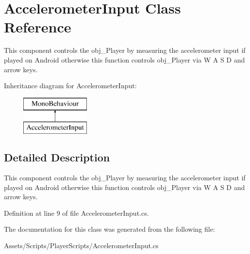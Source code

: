 \hypertarget{class_accelerometer_input}{\section{Accelerometer\+Input Class Reference}
\label{class_accelerometer_input}
}


This component controls the obj\+\_\+\+Player by measuring the accelerometer input if played on Android otherwise this function controls obj\+\_\+\+Player via W A S D and arrow keys.  


Inheritance diagram for Accelerometer\+Input\+:\begin{figure}[H]
\begin{center}
\leavevmode
\includegraphics[height=2.000000cm]{class_accelerometer_input}
\end{center}
\end{figure}


\subsection{Detailed Description}
This component controls the obj\+\_\+\+Player by measuring the accelerometer input if played on Android otherwise this function controls obj\+\_\+\+Player via W A S D and arrow keys. 



Definition at line 9 of file Accelerometer\+Input.\+cs.



The documentation for this class was generated from the following file\+:\begin{DoxyCompactItemize}
\item 
Assets/\+Scripts/\+Player\+Scripts/Accelerometer\+Input.\+cs\end{DoxyCompactItemize}
